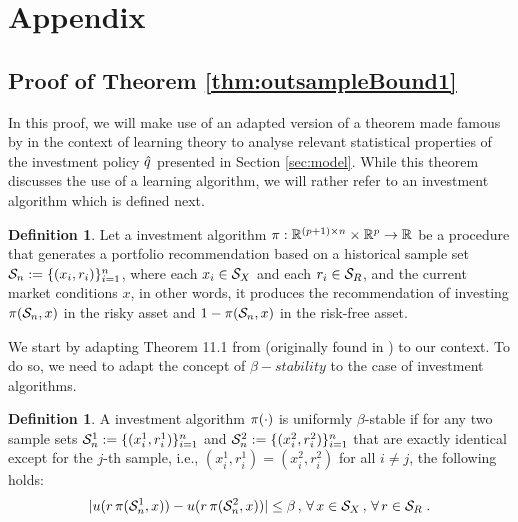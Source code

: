 \documentclass[]{interact}
\theoremstyle{plain}%
\theoremstyle{definition}
\newtheorem{definition}[theorem]{Definition}
\theoremstyle{remark}
\newcommand{\0}{\V{0}}
\newcommand{\1}{\V{1}}
\renewcommand{\Re}{\mathbb{R}}
\newcommand{\modified}[1]{{\color{blue} #1}}
\theoremstyle{plain}
\theoremstyle{definition}
\begin{document}




%
\section{Appendix}

%
\subsection{\modified{Proof of Theorem \ref{thm:outsampleBound1}}}\label{sec:thm1_proof}

In this proof, we will make use of an adapted version of a theorem made famous by \cite{bousquet2002stability} in the context of learning theory to analyse
relevant statistical properties of the investment policy ${\hat{q}}$ presented in Section \ref{sec:model}. While this theorem discusses the use of a learning algorithm, we will rather refer to an investment algorithm which is defined next.
\begin{definition}
  Let a investment algorithm $\investA:\Re^{(p+1)\times n}\times \Re^p \rightarrow \Re$ be a procedure that generates a portfolio recommendation based on a historical sample set
  $\mathcal{S}_n:=\{(x_i,r_i)\}_{i=1}^n$, where each $x_i\in{\mathcal{S}_X}$ and each $r_i\in {\mathcal{S}_R}$,  and the current market conditions $x$, in other words, it produces the recommendation of investing ${\pi}(\mathcal{S}_n,x)$ in the risky asset and $1-{\pi}(\mathcal{S}_n,x)$ in the risk-free asset.
\end{definition}

We start by adapting Theorem 11.1 from \cite{mohri2012foundations} (originally found in \cite{bousquet2002stability}) to our context. To do so, we need to adapt the concept of $\beta-stability$ to the case of investment algorithms.
\begin{definition}
A investment algorithm ${\pi}(\cdot)$ is uniformly $\beta$-stable if for any two sample sets
  $\mathcal{S}_n^1:=\{(x_i^1,r_i^1)\}_{i=1}^n$ and $\mathcal{S}_n^2:=\{(x_i^2,r_i^2)\}_{i=1}^n$ that are
  exactly identical except for the $j$-th sample, i.e., $(x_i^1,r_i^1)=(x_i^2,r_i^2)$ for
  all $i\neq j$, the following holds:
  \[
    |u(r\,{\pi}(\mathcal{S}_n^1, x)) - u(r\,{\pi}(\mathcal{S}_n^2,x))| \leq \beta\,,\,\forall\,x\in{\mathcal{S}_X}\,,\,\forall\,r\in{\mathcal{S}_R}\;.
  \]
\end{definition}
\end{document}
